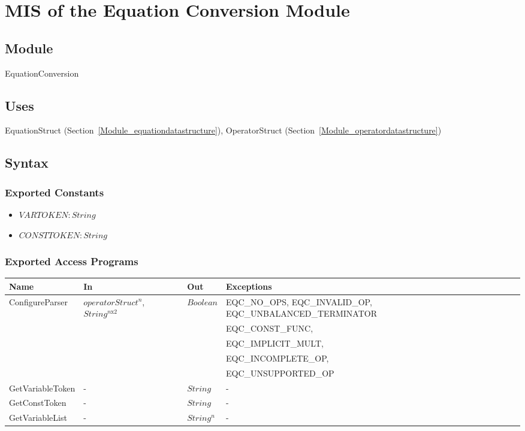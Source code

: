 \documentclass[12pt, titlepage]{article}
\begin{document}
\newpage

\section{MIS of the Equation Conversion Module} 
\label{Module_equationconversion}

\subsection{Module}

EquationConversion

\subsection{Uses}

EquationStruct (Section~\ref{Module_equationdatastructure}), OperatorStruct (Section~\ref{Module_operatordatastructure})

\subsection{Syntax}

\subsubsection{Exported Constants}

\begin{itemize}
	\item $VARTOKEN : String$
	\item $CONSTTOKEN : String$
\end{itemize}

\subsubsection{Exported Access Programs}

\begin{center}
	\begin{tabular}{p{3.2cm} p{2.8cm} p{3cm} p{5cm}}
		\hline
		\textbf{Name} & \textbf{In} & \textbf{Out} & \textbf{Exceptions} \\
		\hline
		\multirow{3}{3.2cm}{ConfigureParser} & 
		\multirow{3}{2.8cm}{$operatorStruct^n$, $String^{n\text{x}2}$} & 
		\multirow{3}{3cm}{$Boolean$} & EQC\_NO\_OPS, EQC\_INVALID\_OP, 
		EQC\_UNBALANCED\_TERMINATOR\\
		\multirow{4}{3.2cm}{MakeEquationTree} & \multirow{4}{2.8cm}{$String$} & 
		\multirow{4}{3cm}{$equationStruct$} & 
		EQC\_CONST\_FUNC, \\	
		& & & EQC\_IMPLICIT\_MULT, \\
		& & & EQC\_INCOMPLETE\_OP, \\
		& & & EQC\_UNSUPPORTED\_OP \\
		GetVariableToken & - & $String$ & - \\
		GetConstToken & - & $String$ & - \\
		GetVariableList & - & $String^n$ & - \\
		\hline
	\end{tabular}
\end{center}
\end{document}
